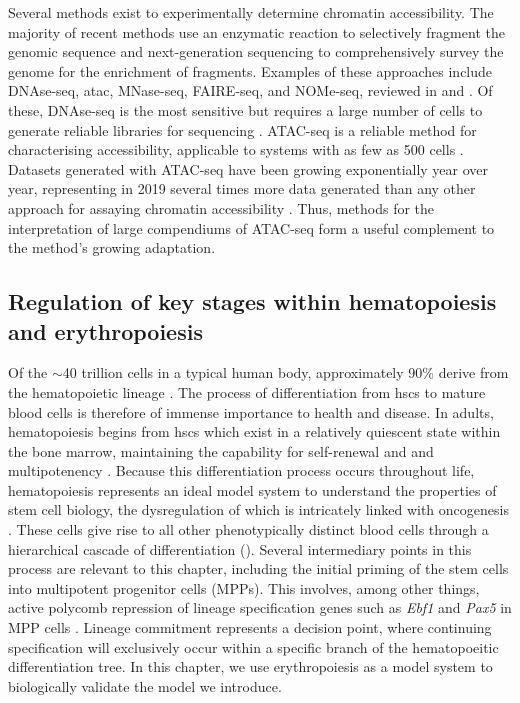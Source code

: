 
Several methods exist to experimentally determine chromatin accessibility. The majority of recent methods use an enzymatic reaction to selectively fragment the genomic sequence and next-generation sequencing to comprehensively survey the genome for the enrichment of fragments. Examples of these approaches include DNAse-seq, \gls{atac}, MNase-seq, FAIRE-seq, and NOMe-seq, reviewed in \textcite{Klemm} and \textcite{Meyer2014}. Of these, DNAse-seq is the most sensitive but requires a large number of cells to generate reliable libraries for sequencing \cite{Boyle2008}. ATAC-seq is a reliable method for characterising accessibility, applicable to systems with as few as 500 cells \cite{Corces2017}. Datasets generated with ATAC-seq have been growing exponentially year over year, representing in 2019 several times more data generated than any other approach for assaying chromatin accessibility \cite{Yan2020}. Thus, methods for the interpretation of large compendiums of ATAC-seq form a useful complement to the method's growing adaptation. 

\subsection{Regulation of key stages within hematopoiesis and erythropoiesis}

Of the $\sim$40 trillion cells in a typical human body, approximately 90\% derive from the hematopoietic lineage \cite{Quinlan2010}. The process of differentiation from \glspl{hsc} to mature blood cells is therefore of immense importance to health and disease. In adults, hematopoiesis begins from \glspl{hsc} which exist in a relatively quiescent state within the bone marrow, maintaining the capability for self-renewal and and multipotenency \cite{Baron2012}. Because this differentiation process occurs throughout life, hematopoiesis represents an ideal model system to understand the properties of stem cell biology, the dysregulation of which is intricately linked with oncogenesis \cite{Orkin2008}. These cells give rise to all other phenotypically distinct blood cells through a hierarchical cascade of differentiation (). Several intermediary points in this process are relevant to this chapter, including the initial priming of the stem cells into multipotent progenitor cells (MPPs). This involves, among other things, active polycomb repression of lineage specification genes such as \textit{Ebf1} and \textit{Pax5} in MPP cells \cite{H2010}. Lineage commitment represents a decision point, where continuing specification will exclusively occur within a specific branch of the hematopoeitic differentiation tree. In this chapter, we use erythropoiesis as a model system to biologically validate the model we introduce. 

